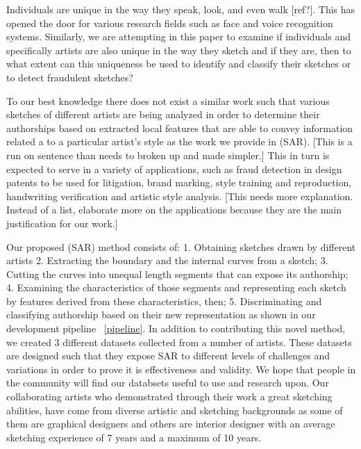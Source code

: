 Individuals are unique in the way they speak, look, and even walk {\color{red}[ref?]}. This has opened the door for various research fields such as face and voice recognition systems. Similarly, we are attempting in this paper to examine if individuals and specifically artists are also unique in the way they sketch and if they are, then to what extent can this uniqueness be used to identify and classify their sketches or to detect fraudulent sketches?

To our best knowledge there does not exist a similar work such that various sketches of different artists are being analyzed in order to determine their authorships based on extracted local features that are able to convey information related a to a particular artist's style as the work we provide in (SAR). {\color{red} [This is a run on sentence than needs to broken up and made simpler.]} This in turn is expected to serve in a variety of applications, such as fraud detection in design patents to be used for litigation, brand marking, style training and reproduction, handwriting verification and artistic style analysis. {\color{red} [This needs more explanation. Instead of a list, elaborate more on the applications because they are the main justification for our work.]}

Our proposed (SAR) method consists of: 1. Obtaining sketches drawn by different artists 2. Extracting the boundary and the internal curves from a sketch; 3. Cutting the curves into unequal length segments that can expose its authorship; 4. Examining the characteristics of those segments and representing each sketch by features derived from these characteristics, then; 5. Discriminating and classifying authorship based on their new representation as shown in our development pipeline ~\ref{pipeline}. In addition to contributing this novel method, we created 3 different datasets collected from  a number of artists. These datasets are designed such that they expose SAR to different levels of challenges and variations in order to prove it is effectiveness and validity. We hope that people in the community will find our databsets useful to use and research upon. Our collaborating artists who demonstrated through their work a great sketching abilities, have come from diverse artistic and sketching backgrounds as some of them are graphical designers and others are interior designer with an average sketching experience of 7 years and a maximum of 10 years.

